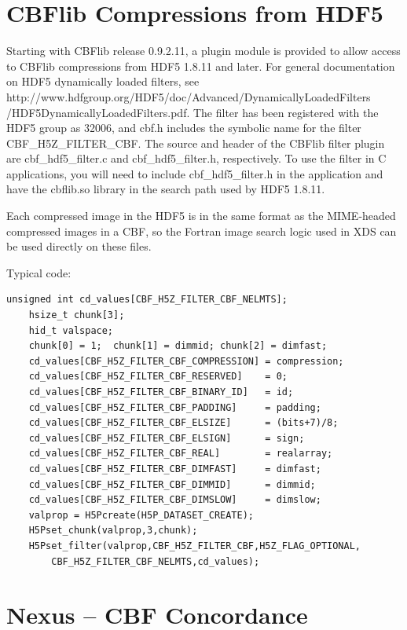 \documentclass[11pt]{a0poster}
\begin{document}
\begin{minipage}[]{0.29\linewidth}
\begin{itemize}
\end{itemize}


\section*{CBFlib Compressions from HDF5}

\fontsize{18}{22}\selectfont %
Starting with CBFlib release 0.9.2.11, a plugin module is provided to allow access to CBFlib compressions from HDF5 1.8.11 and later. For general documentation on HDF5 dynamically loaded filters, see 
http://www.hdfgroup.org/HDF5/doc/Advanced/DynamicallyLoadedFilters
/HDF5DynamicallyLoadedFilters.pdf.
The filter has been registered with the HDF5 group as 32006, and cbf.h includes the symbolic name for the filter CBF\_H5Z\_FILTER\_CBF.
The source and header of the CBFlib filter plugin are cbf\_hdf5\_filter.c and cbf\_hdf5\_filter.h, respectively. To use the filter in C applications, you will need to include cbf\_hdf5\_filter.h in the application and have the cbflib.so library in the search path used by HDF5 1.8.11. 

Each compressed image in the HDF5 is in the same format as the MIME-headed compressed images in a CBF, so the Fortran image search logic used in XDS can be used directly on these files.

Typical code:

\begin{verbatim}
unsigned int cd_values[CBF_H5Z_FILTER_CBF_NELMTS];
    hsize_t chunk[3];
    hid_t valspace;
    chunk[0] = 1;  chunk[1] = dimmid; chunk[2] = dimfast;
    cd_values[CBF_H5Z_FILTER_CBF_COMPRESSION] = compression;
    cd_values[CBF_H5Z_FILTER_CBF_RESERVED]    = 0;
    cd_values[CBF_H5Z_FILTER_CBF_BINARY_ID]   = id;
    cd_values[CBF_H5Z_FILTER_CBF_PADDING]     = padding;
    cd_values[CBF_H5Z_FILTER_CBF_ELSIZE]      = (bits+7)/8;
    cd_values[CBF_H5Z_FILTER_CBF_ELSIGN]      = sign;
    cd_values[CBF_H5Z_FILTER_CBF_REAL]        = realarray;
    cd_values[CBF_H5Z_FILTER_CBF_DIMFAST]     = dimfast;
    cd_values[CBF_H5Z_FILTER_CBF_DIMMID]      = dimmid;
    cd_values[CBF_H5Z_FILTER_CBF_DIMSLOW]     = dimslow;
    valprop = H5Pcreate(H5P_DATASET_CREATE);
    H5Pset_chunk(valprop,3,chunk);
    H5Pset_filter(valprop,CBF_H5Z_FILTER_CBF,H5Z_FLAG_OPTIONAL,
        CBF_H5Z_FILTER_CBF_NELMTS,cd_values);
\end{verbatim}

\section*{Nexus -- CBF Concordance}
\begin{itemize}


\end{itemize}
\end{minipage}
\end{document}
